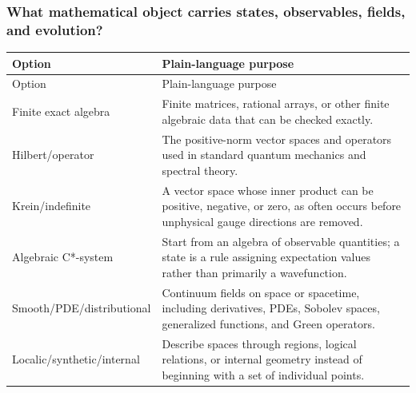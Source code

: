 \subsubsection{What mathematical object carries states, observables, fields, and evolution?}
\begingroup
\small
\begin{longtable}{@{}p{}p{}@{}}
\toprule
Option & Plain-language purpose \\
\midrule
\endfirsthead
\toprule
Option & Plain-language purpose \\
\midrule
\endhead
Finite exact algebra & Finite matrices, rational arrays, or other finite algebraic data that can be checked exactly. \\
Hilbert/operator & The positive-norm vector spaces and operators used in standard quantum mechanics and spectral theory. \\
Krein/indefinite & A vector space whose inner product can be positive, negative, or zero, as often occurs before unphysical gauge directions are removed. \\
Algebraic C*-system & Start from an algebra of observable quantities; a state is a rule assigning expectation values rather than primarily a wavefunction. \\
Smooth/PDE/distributional & Continuum fields on space or spacetime, including derivatives, PDEs, Sobolev spaces, generalized functions, and Green operators. \\
Localic/synthetic/internal & Describe spaces through regions, logical relations, or internal geometry instead of beginning with a set of individual points. \\
\bottomrule
\end{longtable}
\endgroup

